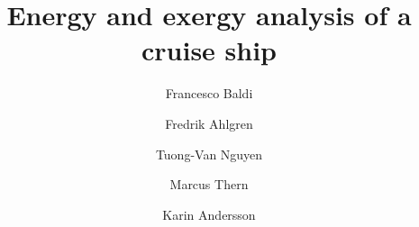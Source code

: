 \documentclass[preprint,12pt]{elsarticle}
\begin{document}
\begin{frontmatter}



\title{Energy and exergy analysis of a cruise ship}


\author[EPFL]{Francesco Baldi}
\author[Linnaeus]{Fredrik Ahlgren}
\author[DTU,SP]{Tuong-Van Nguyen}
\author[LTU]{Marcus Thern}
\author[CTU]{Karin Andersson}

\address[EPFL]{Industrial Process Energy Systems Engineering (IPESE), \'{E}cole Polytechnique F\'{e}d\'{e}rale de Lausanne, 1950, Sion, Switzerland}
\address[Linnaeus]{Kalmar Maritime Academy, Linnaeus University, Kalmar, Sweden}
\address[SP]{Laboratory of Environmental and Thermal Engineering, Polytechnic School - University of S\~{a}o Paulo, S\~{a}o Paulo, Brazil}
\address[DTU]{Department of Mechanical Engineering, Technical University of Denmark, Lyngby, Denmark}
\address[LTU]{Energy Sciences, Lund University, Lund SE-22100, Sweden}
\address[CTU]{Department of Mechanics and Maritime Sciences, Chalmers University of technology, Gothenburg, Sweden}




\end{frontmatter}
\end{document}
